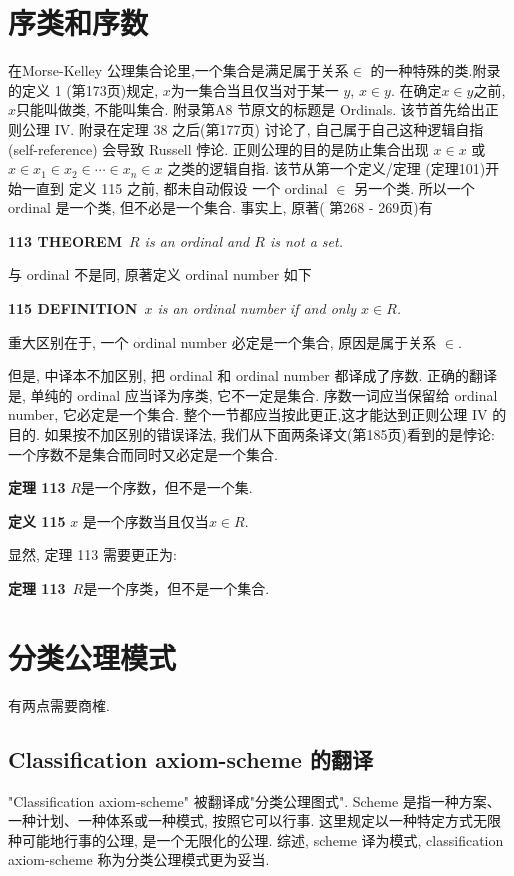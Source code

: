 \documentclass[zihao=-4,a4paper]{ctexart}
\begin{document}
\section{序类和序数 }
在Morse-Kelley 公理集合论里,一个集合是满足属于关系$\in$ 的一种特殊的类.附录的定义 1 (\cite{jkelley2010zh}第173页)规定, $x$为一集合当且仅当对于某一 $y$, $x\in y$. 在确定$x\in y$之前, $x$只能叫做类, 不能叫集合.
附录第A8 节原文的标题是 Ordinals. 该节首先给出正则公理 IV. 附录在定理 38 之后(\cite{jkelley2010zh}第177页) 讨论了, 自己属于自己这种逻辑自指 (self-reference) 会导致 
Russell 悖论. 正则公理的目的是防止集合出现 $x\in x$ 或 
$x\in x_1 \in x_2 \in \cdots \in x_n \in x$
之类的逻辑自指. 该节从第一个定义/定理 (定理101)开始一直到 定义 115 之前, 都未自动假设 一个 ordinal $\in$ 另一个类. 所以一个 ordinal 是一个类, 但不必是一个集合.
事实上, 原著(\cite{jkelley1975} 第268 - 269页)有

{\bf 113 THEOREM}\,
{\sl 
	$R$ is an ordinal and $R$ is not a set.
}

\noindent 与 ordinal 不是同, 原著定义 ordinal number 如下

{\bf 115 DEFINITION}\,
{\sl 
	$x$ is an ordinal number if and only $x \in R$.
}

\noindent 重大区别在于, 一个 ordinal number 必定是一个集合, 原因是属于关系 $\in$.

但是, 中译本不加区别, 把 ordinal  和 ordinal number 都译成了序数. 正确的翻译是, 单纯的 ordinal 应当译为{\kaishu 序类}, 它不一定是集合. {\kaishu 序数}一词应当保留给 ordinal number, 它必定是一个集合. 整个一节都应当按此更正,这才能达到正则公理 IV 的目的.
如果按不加区别的错误译法, 我们从下面两条译文(\cite{jkelley2010zh}第185页)看到的是悖论: 一个序数不是集合而同时又必定是一个集合.

{\bf 定理 113}
{\kaishu
$R$是一个序数，但不是一个集.
}

{\bf 定义 115}
{\kaishu
$x$ 是一个序数当且仅当$x\in R$.
}

\noindent 显然, 定理 113 需要更正为:

{\bf 定理 113}\, 
{\kaishu
	$R$是一个序类，但不是一个集合.
}


\section{分类公理模式 }	
有两点需要商榷.
\subsection{Classification axiom-scheme 的翻译}
"Classification axiom-scheme" 被翻译成"分类公理图式". Scheme  是指一种方案、一种计划、一种体系或一种模式, 按照它可以行事. 这里规定以一种特定方式无限种可能地行事的公理, 是一个无限化的公理. 
综述, scheme 译为模式, classification axiom-scheme 称为分类公理模式更为妥当.
\end{document}
